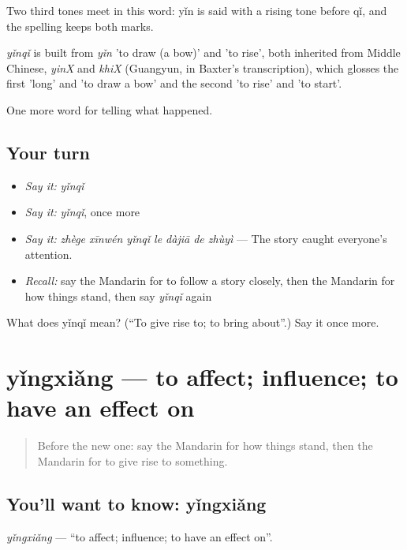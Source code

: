 Two third tones meet in this word: yǐn is said with a rising tone before qǐ, and the spelling keeps both marks.

\begin{cousinweb}
\emph{yǐnqǐ} is built from \emph{yǐn} 'to draw (a bow)' and  'to rise', both inherited from Middle Chinese, \emph{yinX} and \emph{khiX} (Guangyun, in Baxter's transcription), which glosses the first 'long' and 'to draw a bow' and the second 'to rise' and 'to start'.
\end{cousinweb}

\begin{grammarlens}[title={What you've built}]
One more word for telling what happened.
\end{grammarlens}

\subsection*{Your turn}
\begin{itemize}
\raggedright
  \item \emph{Say it:} \emph{yǐnqǐ}
  \item \emph{Say it:} \emph{yǐnqǐ}, once more
  \item \emph{Say it:} \emph{zhège xīnwén yǐnqǐ le dàjiā de zhùyì} — The story caught everyone's attention.
  \item \emph{Recall:} say the Mandarin for to follow a story closely, then the Mandarin for how things stand, then say \emph{yǐnqǐ} again
\end{itemize}

\begin{tcolorbox}[breakable,colback=teal!4,colframe=teal!35!black,title={Before you move on}]
What does yǐnqǐ mean? (\textquotedblleft{}To give rise to; to bring about\textquotedblright{}.) Say it once more.
\end{tcolorbox}
\section[yǐngxiǎng]{yǐngxiǎng — to affect; influence; to have an effect on}

\label{lesson:ZH-C294-yingxiang}



\begin{quote}
Before the new one: say the Mandarin for how things stand, then the Mandarin for to give rise to something.
\end{quote}

\subsection*{You'll want to know: yǐngxiǎng}
\emph{yǐngxiǎng} — \textquotedblleft{}to affect; influence; to have an effect on\textquotedblright{}.

